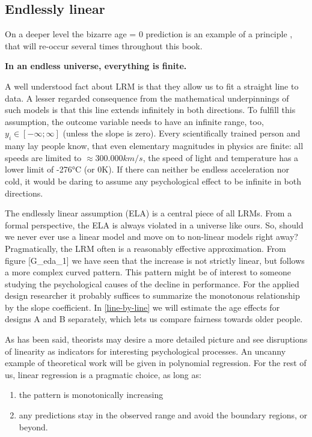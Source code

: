 \documentclass[]{svmono}
\providecommand{\tightlist}{%
  \setlength{\itemsep}{0pt}\setlength{\parskip}{0pt}}
\begin{document}
\subsection{Endlessly linear}\label{endlessly-linear}

On a deeper level the bizarre age = 0 prediction is an example of a
principle , that will re-occur several times throughout this book.

\textbf{In an endless universe, everything is finite.}

A well understood fact about LRM is that they allow us to fit a straight
line to data. A lesser regarded consequence from the mathematical
underpinnings of such models is that this line extends infinitely in
both directions. To fulfill this assumption, the outcome variable needs
to have an infinite range, too, \(y_i \in [-\infty; \infty]\) (unless
the slope is zero). Every scientifically trained person and many lay
people know, that even elementary magnitudes in physics are finite: all
speeds are limited to \(\approx 300.000 km/s\), the speed of light and
temperature has a lower limit of -276°C (or 0K). If there can neither be
endless acceleration nor cold, it would be daring to assume any
psychological effect to be infinite in both directions.

The endlessly linear assumption (ELA) is a central piece of all LRMs.
From a formal perspective, the ELA is always violated in a universe like
ours. So, should we never ever use a linear model and move on to
non-linear models right away? Pragmatically, the LRM often is a
reasonably effective approximation. From figure {[}G\_eda\_1{]} we have
seen that the increase is not strictly linear, but follows a more
complex curved pattern. This pattern might be of interest to someone
studying the psychological causes of the decline in performance. For the
applied design researcher it probably suffices to summarize the
monotonous relationship by the slope coefficient. In \ref{line-by-line}
we will estimate the age effects for designs A and B separately, which
lets us compare fairness towards older people.

As has been said, theorists may desire a more detailed picture and see
disruptions of linearity as indicators for interesting psychological
processes. An uncanny example of theoretical work will be given in
polynomial regression. For the rest of us, linear regression is a
pragmatic choice, as long as:

\begin{enumerate}
\def\labelenumi{\arabic{enumi}.}
\tightlist
\item
  the pattern is monotonically increasing
\item
  any predictions stay in the observed range and avoid the boundary
  regions, or beyond.
\end{enumerate}
\end{document}
